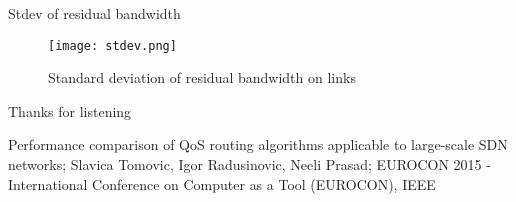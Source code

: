 \documentclass{beamer}
\begin{document}
\begin{frame}{Stdev of residual bandwidth}
    \begin{figure}
    \texttt{[image: stdev.png]}
    \caption{Standard deviation of residual bandwidth on links}
\end{figure}
\end{frame}

\begin{frame}[standout]
    Thanks for listening
    
    \begin{scriptsize}
Performance comparison of QoS routing algorithms applicable to large-scale SDN networks; Slavica Tomovic, Igor Radusinovic, Neeli Prasad;  EUROCON 2015 - International Conference on Computer as a Tool (EUROCON), IEEE

\end{scriptsize}
\end{frame}
\end{document}
